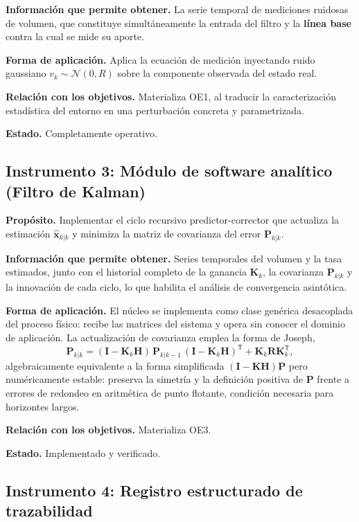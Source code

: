 \textbf{Información que permite obtener.} La serie temporal de mediciones
ruidosas de volumen, que constituye simultáneamente la entrada del filtro y la
\textbf{línea base} contra la cual se mide su aporte.

\textbf{Forma de aplicación.} Aplica la ecuación de medición inyectando ruido
gaussiano $v_{k} \sim \mathcal{N}(0, R)$ sobre la componente observada del
estado real.

\textbf{Relación con los objetivos.} Materializa OE1, al traducir la
caracterización estadística del entorno en una perturbación concreta y
parametrizada.

\textbf{Estado.} Completamente operativo.

\subsection{Instrumento 3: Módulo de software analítico (Filtro de Kalman)}

\textbf{Propósito.} Implementar el ciclo recursivo predictor-corrector que
actualiza la estimación $\hat{\mathbf{x}}_{k|k}$ y minimiza la matriz de
covarianza del error $\mathbf{P}_{k|k}$.

\textbf{Información que permite obtener.} Series temporales del volumen y la
tasa estimados, junto con el historial completo de la ganancia
$\mathbf{K}_{k}$, la covarianza $\mathbf{P}_{k|k}$ y la innovación de cada
ciclo, lo que habilita el análisis de convergencia asintótica.

\textbf{Forma de aplicación.} El núcleo se implementa como clase genérica
desacoplada del proceso físico: recibe las matrices del sistema y opera sin
conocer el dominio de aplicación. La actualización de covarianza emplea la forma
de Joseph,
\[
\mathbf{P}_{k|k} = (\mathbf{I}-\mathbf{K}_{k}\mathbf{H})\,\mathbf{P}_{k|k-1}\,
(\mathbf{I}-\mathbf{K}_{k}\mathbf{H})^{\mathsf{T}}
+ \mathbf{K}_{k}\mathbf{R}\mathbf{K}_{k}^{\mathsf{T}},
\]
algebraicamente equivalente a la forma simplificada
$(\mathbf{I}-\mathbf{K}\mathbf{H})\mathbf{P}$ pero numéricamente estable:
preserva la simetría y la definición positiva de $\mathbf{P}$ frente a errores
de redondeo en aritmética de punto flotante, condición necesaria para
horizontes largos.

\textbf{Relación con los objetivos.} Materializa OE3.

\textbf{Estado.} Implementado y verificado.

\subsection{Instrumento 4: Registro estructurado de trazabilidad}

